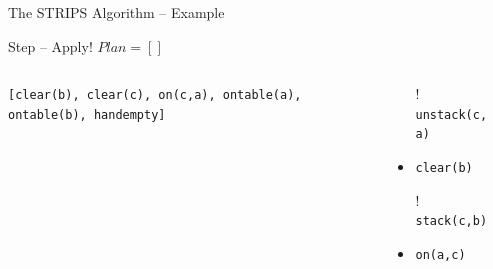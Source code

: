 \documentclass[presentation]{beamer}\mode<presentation>{\usetheme{AMSBolognaFC}}
\begin{document}
\begin{frame}[c]{The STRIPS Algorithm -- Example}
\small

	\begin{exampleblock}{Step \nextStripsExampleStep{}  -- Apply! \hfill $Plan = []$}
		\begin{columns}[t]
			\begin{column}{.30\linewidth}\centering
				\texttt{[clear(b), clear(c), on(c,a), ontable(a), ontable(b), handempty]}
			\end{column}
			\begin{column}{.50\linewidth}\centering
				\begin{itemize}
					\item[!] \texttt{unstack(c, a)}
					\item \texttt{clear(b)}
					\item[!] \texttt{stack(c,b)}
					\item \texttt{on(a,c)}
				\end{itemize}
			\end{column}
			\begin{column}{.10\linewidth}\centering
				
			\end{column}
		\end{columns}
	\end{exampleblock}

\end{frame}

\end{document}

